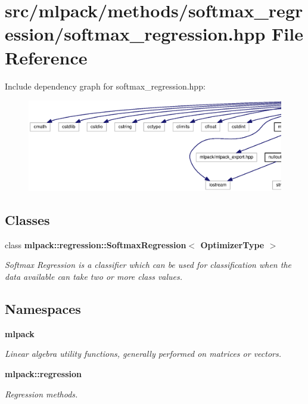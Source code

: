 \section{src/mlpack/methods/softmax\+\_\+regression/softmax\+\_\+regression.hpp File Reference}
\label{softmax__regression_8hpp}
Include dependency graph for softmax\+\_\+regression.\+hpp\+:
\nopagebreak
\begin{figure}[H]
\begin{center}
\leavevmode
\includegraphics[width=350pt]{softmax__regression_8hpp__incl}
\end{center}
\end{figure}
\subsection*{Classes}
\begin{DoxyCompactItemize}
\item 
class {\bf mlpack\+::regression\+::\+Softmax\+Regression$<$ Optimizer\+Type $>$}
\begin{DoxyCompactList}\small\item\em Softmax Regression is a classifier which can be used for classification when the data available can take two or more class values. \end{DoxyCompactList}\end{DoxyCompactItemize}
\subsection*{Namespaces}
\begin{DoxyCompactItemize}
\item 
 {\bf mlpack}
\begin{DoxyCompactList}\small\item\em Linear algebra utility functions, generally performed on matrices or vectors. \end{DoxyCompactList}\item 
 {\bf mlpack\+::regression}
\begin{DoxyCompactList}\small\item\em Regression methods. \end{DoxyCompactList}\end{DoxyCompactItemize}


